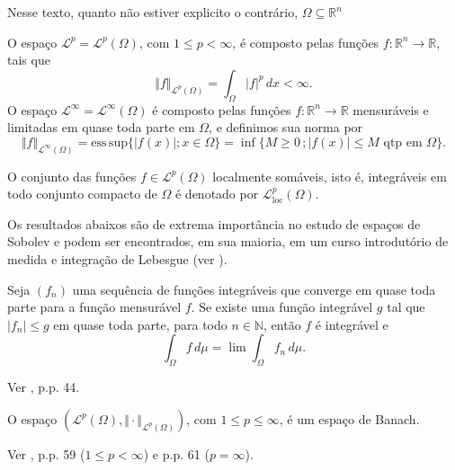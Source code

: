 \documentclass[a4paper, 11pt]{book}
\theoremstyle{definition}
\newcommand{\bN}{\mathbb{N}}
\newcommand{\bR}{\mathbb{R}}
\newcommand{\cL}{\mathcal{L}}
\begin{document}
Nesse texto, quanto não estiver explicito o contrário, $\Omega \subseteq \bR^n$

\begin{dbox}[Espaços $\cL^p$ e $\cL^\infty$]
    O espaço $\cL^p = \cL^p(\Omega)$, com $1 \leqslant p < \infty$, é composto pelas funções $f : \bR^n \to \bR$, tais que
    \[
        \Vert f \Vert_{\cL^p(\Omega)} = \int_\Omega |f|^p \, dx < \infty.
    \]
    O espaço $\cL^\infty = \cL^\infty(\Omega)$ é composto pelas funções $f : \bR^n \to \bR$ mensuráveis e limitadas em quase toda parte em $\Omega$, e definimos sua norma por
    \[
        \Vert f \Vert_{\cL^\infty(\Omega)} = \mathrm{ess\,sup} \{|f(x)|; x \in \Omega\} =\inf \{M \geqslant 0 \,; |f(x)| \leqslant M \text{ qtp em } \Omega\}.
    \]
\end{dbox}

\begin{dbox}
    O conjunto das funções $f \in \cL^p(\Omega)$ localmente somáveis, isto é, integráveis em todo conjunto compacto de $\Omega$ é denotado por $\cL^p_{\mathrm{loc}}(\Omega)$.
\end{dbox}

Os resultados abaixos são de extrema importância no estudo de espaços de Sobolev e podem ser encontrados, em sua maioria, em um curso introdutório de medida e integração de Lebesgue (ver \cite{axler-measure.theory,bartle-measure.theory,folland-real.analysis}).

\begin{tbox} \label{thm:teorema-da-convergencia-dominada}
    Seja $(f_n)$ uma sequência de funções integráveis que converge em quase toda parte para a função mensurável $f$.
    Se existe uma função integrável $g$ tal que $|f_n| \leqslant g$ em quase toda parte, para todo $n \in \bN$, então $f$ é integrável e
    \[
        \int_\Omega f \,d\mu = \lim \int_\Omega f_n \,d\mu.
    \]
\end{tbox}
\begin{prf}
    Ver \cite{bartle-measure.theory}, p.p. 44.
\end{prf}

\begin{tbox} \label{thm:lp-completo-pre}
    O espaço $(\cL^p(\Omega), \Vert \cdot \Vert_{\cL^p(\Omega)})$, com $1 \leqslant p \leqslant \infty$, é um espaço de Banach.\footnotemark
\end{tbox}
\begin{prf}
    Ver \cite{bartle-measure.theory}, p.p. 59 ($1 \leqslant p < \infty$) e p.p. 61 ($p = \infty$).
\end{prf}
\end{document}
